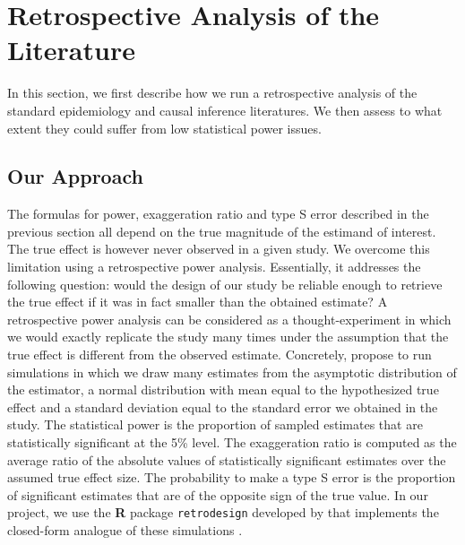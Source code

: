\documentclass[12pt]{article}
\begin{document}



\section{Retrospective Analysis of the Literature}

    In this section, we first describe how we run a retrospective analysis of the standard epidemiology and causal inference literatures. We then assess to what extent they could suffer from low statistical power issues.
    
    \subsection{Our Approach}
    
    The formulas for power, exaggeration ratio and type S error described in the previous section all depend on the true magnitude of the estimand of interest. The true effect is however never observed in a given study.  We overcome this limitation using a retrospective power analysis. Essentially, it addresses the following question: would the design of our study be reliable enough to retrieve the true effect if it was in fact smaller than the obtained estimate? A retrospective power analysis can be considered as a thought-experiment in which we would exactly replicate the study many times under the assumption that the true effect is different from the observed estimate. Concretely, \cite{gelman_beyond_2014} propose to run simulations in which we draw many estimates from the asymptotic distribution of the estimator, a normal distribution with mean equal to the hypothesized true effect and a standard deviation equal to the standard error we obtained in the study. The statistical power is the proportion of sampled estimates that are statistically significant at the 5\% level. The exaggeration ratio is computed as the average ratio of the absolute values of statistically significant estimates over the assumed true effect size. The probability to make a type S error is the proportion of significant estimates that are of the opposite sign of the true value. In our project, we use the \textbf{\textsf{R}} package \texttt{retrodesign} developed by \cite{timm_retrodesign_2019} that implements the closed-form analogue of these simulations \citep{lu_note_2019}.
    
\end{document}
